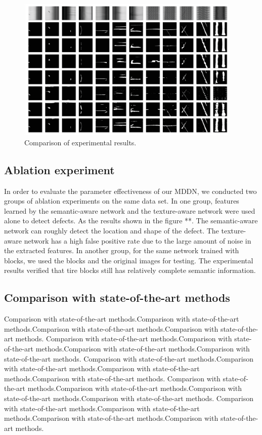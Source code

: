 \documentclass{article}
\begin{document}
\begin{figure}[t]
  \centering
  \centerline{\includegraphics[width=0.95\textwidth]{pic3.eps}}
  \caption{Comparison of experimental results.}
\end{figure}

\subsection{Ablation experiment}
\label{Ablation experiment}
In order to evaluate the parameter effectiveness of our MDDN, we conducted two groups of ablation experiments on the same data set. In one group, features learned by the semantic-aware network and the texture-aware network were used alone to detect defects. As the results shown in the figure **. The semantic-aware network can roughly detect the location and shape of the defect. The texture-aware network has a high false positive rate due to the large amount of noise in the extracted features. In another group, for the same network trained with blocks, we used the blocks and the original images for testing. The experimental results verified that tire blocks still has relatively complete semantic information.

\subsection{Comparison with state-of-the-art methods}
\label{state-of-the-art methods}
Comparison with state-of-the-art methods.Comparison with state-of-the-art methods.Comparison with state-of-the-art methods.Comparison with state-of-the-art methods.
Comparison with state-of-the-art methods.Comparison with state-of-the-art methods.Comparison with state-of-the-art methods.Comparison with state-of-the-art methods.
Comparison with state-of-the-art methods.Comparison with state-of-the-art methods.Comparison with state-of-the-art methods.Comparison with state-of-the-art methods.
Comparison with state-of-the-art methods.Comparison with state-of-the-art methods.Comparison with state-of-the-art methods.Comparison with state-of-the-art methods.
Comparison with state-of-the-art methods.Comparison with state-of-the-art methods.Comparison with state-of-the-art methods.Comparison with state-of-the-art methods.
\end{document}
